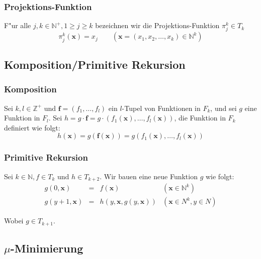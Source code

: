 \documentclass[german, 10pt, a4paper, twocolumn]{scrartcl}
\theoremstyle{definition}
\theoremstyle{example}
\begin{document}
\subsubsection{Projektions-Funktion}

F"ur alle $j,k \in \mathbb{N}^+, 1 \geq j \geq k$ bezeichnen wir die Projektions-Funktion $\pi^k_j \in T_k$
\begin{displaymath}
	\pi^k_j (\mathbf{x}) = x_j \qquad (\mathbf{x} = (x_1,x_2, \ldots , x_k) \in \mathbb{N}^k)
\end{displaymath}

\subsection{Komposition/Primitive Rekursion}

\subsubsection{Komposition}

Sei $k,l \in \mathbb{Z}^+$ und $\mathbf{f} = (f_1,\ldots,f_l)$ ein $l$-Tupel von Funktionen in $F_k$, und sei $g$ eine Funktion in $F_l$. Sei $h=g\cdotp \mathbf{f} = g\cdotp (f_1(\mathbf{x}),\ldots,f_l(\mathbf{x}))$, die Funktion in $F_k$ definiert wie folgt:
\begin{displaymath}
	h(\mathbf{x}) = g(\mathbf{f}(\mathbf{x})) = g(f_1(\mathbf{x}), \ldots, f_l(\mathbf{x}))
\end{displaymath}

\subsubsection{Primitive Rekursion}

Sei $k \in \mathbb{N}, f \in T_k$ und $h \in T_{k+2}$. Wir bauen eine neue Funktion $g$ wie folgt:
\begin{displaymath}
\begin{array}{rcll}
	g(0, \mathbf{x}) &	= &	f(\mathbf{x}) &				(\mathbf{x} \in \mathbb{N}^k)\\
	g(y+1, \mathbf{x}) &	= &	h(y, \mathbf{x}, g(y, \mathbf{x})) &	(\mathbf{x} \in N^k, y \in N)
\end{array}
\end{displaymath}

Wobei $g \in T_{k+1}$.

\subsection{$\mu$-Minimierung}
\end{document}
